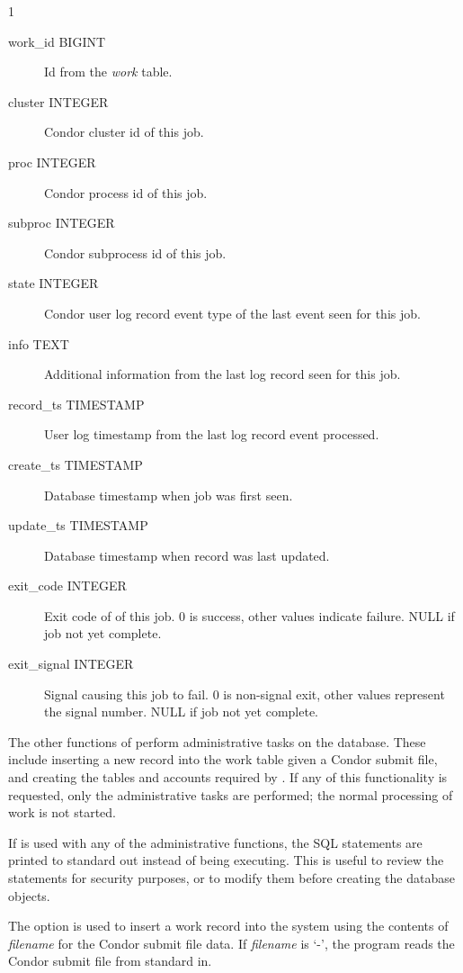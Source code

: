 \begin{ManPage}{\label{man-condor-dbq.pl}}{1}
\begin{description}
  \begin{description}
    \item[work\_id BIGINT]
	Id from the \emph{work} table.
    \item[cluster INTEGER]
	Condor cluster id of this job.
    \item[proc INTEGER]
	Condor process id of this job.
    \item[subproc INTEGER]
	Condor subprocess id of this job.
    \item[state INTEGER]
	Condor user log record event type of the last event seen for this job.
    \item[info TEXT]
	Additional information from the last log record seen for this job.
    \item[record\_ts TIMESTAMP]
	User log timestamp from the last log record event processed.
    \item[create\_ts TIMESTAMP]
	Database timestamp when job was first seen.
    \item[update\_ts TIMESTAMP]
	Database timestamp when record was last updated.
    \item[exit\_code INTEGER]
	Exit code of of this job.
	0 is success, other values indicate failure.
	NULL if job not yet complete.
    \item[exit\_signal INTEGER]
	Signal causing this job to fail.
	0 is non-signal exit, other values represent the signal number.
	NULL if job not yet complete.
  \end{description}
\end{description}

The other functions of  perform administrative tasks on the
database.
These include inserting a new record into the work table given a Condor submit
file, and creating the tables and accounts required by .
If any of this functionality is requested, only the administrative tasks are
performed; the normal processing of work is not started.

If  is used with any of the administrative functions, 
the SQL statements are printed to standard out instead of being executing.
This is useful to review the statements for security purposes, or to modify
them before creating the database objects.

The  option is used to insert a work record into
the system using the contents of \emph{filename} for the Condor submit file
data.  If \emph{filename} is `-', the program reads the Condor submit file from
standard in.


\end{ManPage}
